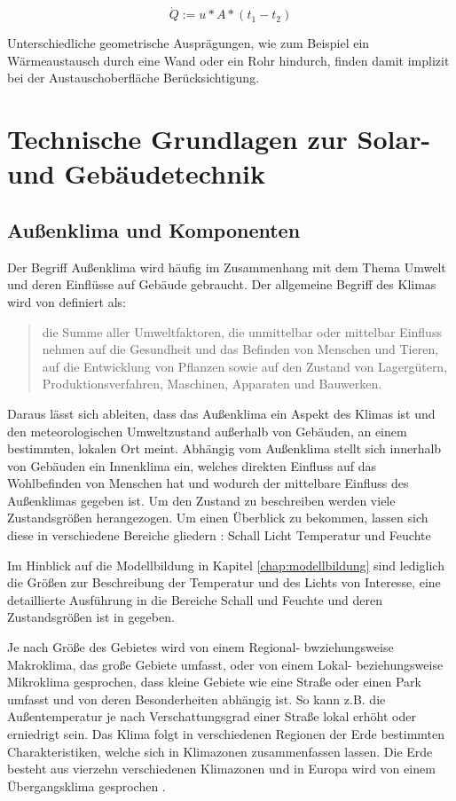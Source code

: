 \begin{equation}
\label{eq:qdot}
\dot{Q} := u*A*(t_{1}-t_{2})
\end{equation}

Unterschiedliche geometrische Ausprägungen, wie zum Beispiel ein Wärmeaustausch durch eine Wand oder ein Rohr hindurch, finden damit implizit bei der Austauschoberfläche Berücksichtigung.



\section{Technische Grundlagen zur Solar- und Gebäudetechnik}

\subsection{Außenklima und Komponenten}

Der Begriff Außenklima wird häufig im Zusammenhang mit dem Thema Umwelt und deren Einflüsse auf Gebäude gebraucht.  Der allgemeine Begriff des Klimas wird von \cite[S.~295]{ha13} definiert als:
\begin{quote}
\Gun die Summe aller Umweltfaktoren, die unmittelbar oder mittelbar Einfluss nehmen auf die Gesundheit und das Befinden von Menschen und Tieren, auf die Entwicklung von Pflanzen sowie auf den Zustand von Lagergütern, Produktionsverfahren, Maschinen, Apparaten und Bauwerken.\Gob
\end{quote}

Daraus lässt sich ableiten, dass das Außenklima ein Aspekt des Klimas ist und den meteorologischen Umweltzustand außerhalb von Gebäuden, an einem bestimmten, lokalen Ort meint. Abhängig vom Außenklima stellt sich innerhalb von Gebäuden ein Innenklima ein, welches direkten Einfluss auf das Wohlbefinden von Menschen hat und wodurch der mittelbare Einfluss des Außenklimas gegeben ist. Um den Zustand zu beschreiben werden viele Zustandsgrößen herangezogen. Um einen Überblick zu bekommen, lassen sich diese in verschiedene Bereiche gliedern \cite[S.~295f.]{ha13} :
Schall
Licht
Temperatur
und Feuchte
 
Im Hinblick auf die Modellbildung in Kapitel \ref{chap:modellbildung} sind lediglich die Größen zur Beschreibung der Temperatur und des Lichts von Interesse, eine detaillierte Ausführung in die Bereiche Schall und Feuchte und deren Zustandsgrößen ist in \cite{ha13} gegeben.

Je nach Größe des Gebietes wird von einem Regional- bwziehungsweise Makroklima, das große Gebiete umfasst, oder von einem Lokal- beziehungsweise Mikroklima gesprochen, dass kleine Gebiete wie eine Straße oder einen Park umfasst und von deren Besonderheiten abhängig ist. So kann z.B. die Außentemperatur je nach Verschattungsgrad einer Straße lokal erhöht oder erniedrigt sein.
Das Klima folgt in verschiedenen Regionen der Erde bestimmten Charakteristiken, welche sich in Klimazonen zusammenfassen lassen. Die Erde besteht aus vierzehn verschiedenen Klimazonen und in Europa wird von einem Übergangsklima gesprochen \cite[S.~296f.]{ha13}. 

